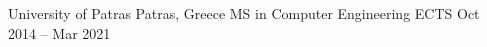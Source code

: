 
\begin{cventries}
    \cventryiv
        {University of Patras}
        {Patras, Greece}
        {MS in Computer Engineering  ECTS}
        {Oct 2014 -- Mar 2021}
\end{cventries}
